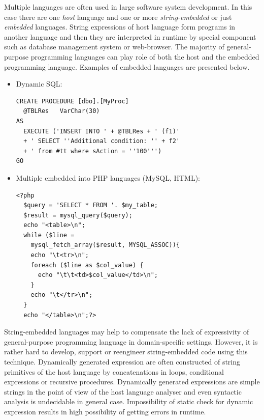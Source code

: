 \documentclass{acm_proc_article-sp}
\begin{document}
Multiple languages are often used in large software system development. In this case there are one {\it host} language and one or more {\it string-embedded} or just {\it embedded} languages. String expressions of host language form programs in another language and then they are interpreted in runtime by special component such as database management system or web-browser. The majority of general-purpose programming languages can play role of both the host and the embedded programming language. Examples of embedded languages are presented below.

\begin{itemize}

\!
\item Dynamic SQL:
\!
\begin{verbatim}
CREATE PROCEDURE [dbo].[MyProc] 
  @TBLRes   VarChar(30)
AS
  EXECUTE ('INSERT INTO ' + @TBLRes + ' (f1)'
  + ' SELECT ''Additional condition: '' + f2'
  + ' from #tt where sAction = ''100''')
GO
\end{verbatim}

\item Multiple embedded into PHP languages (MySQL, HTML):

\begin{verbatim}
<?php
  $query = 'SELECT * FROM '. $my_table;
  $result = mysql_query($query);  
  echo "<table>\n";
  while ($line = 
    mysql_fetch_array($result, MYSQL_ASSOC)){
    echo "\t<tr>\n";
    foreach ($line as $col_value) {
      echo "\t\t<td>$col_value</td>\n";
    }
    echo "\t</tr>\n";
  }
  echo "</table>\n";?> 
\end{verbatim}

\end{itemize}

String-embedded languages may help to compensate the lack of expressivity of general-purpose programming language in domain-specific settings. However, it is rather hard to develop, support or reengineer string-embedded code using this technique. Dynamically generated expression are often constructed of string primitives of the host language by concatenations in loops, conditional expressions or recursive procedures. Dynamically generated expressions are simple strings in the point of view of the host language analyser and  even syntactic analysis is undecidable in general case. Impossibility of static check for dynamic expression results in high possibility of getting errors in runtime. 
\end{document}
